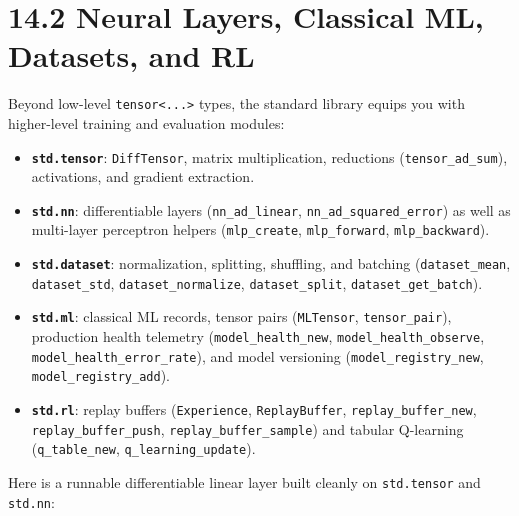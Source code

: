 \documentclass[
  english,
  oneside]{book}
\providecommand{\tightlist}{%
  \setlength{\itemsep}{0pt}\setlength{\parskip}{0pt}}
\begin{document}
\section{14.2 Neural Layers, Classical ML, Datasets, and
RL}\label{neural-layers-classical-ml-datasets-and-rl}

Beyond low-level \texttt{tensor\textless{}...\textgreater{}} types, the
standard library equips you with higher-level training and evaluation
modules:

\begin{itemize}
\tightlist
\item
  \textbf{\texttt{std.tensor}}: \texttt{DiffTensor}, matrix
  multiplication, reductions (\texttt{tensor\_ad\_sum}), activations,
  and gradient extraction.
\item
  \textbf{\texttt{std.nn}}: differentiable layers
  (\texttt{nn\_ad\_linear}, \texttt{nn\_ad\_squared\_error}) as well as
  multi-layer perceptron helpers (\texttt{mlp\_create},
  \texttt{mlp\_forward}, \texttt{mlp\_backward}).
\item
  \textbf{\texttt{std.dataset}}: normalization, splitting, shuffling,
  and batching (\texttt{dataset\_mean}, \texttt{dataset\_std},
  \texttt{dataset\_normalize}, \texttt{dataset\_split},
  \texttt{dataset\_get\_batch}).
\item
  \textbf{\texttt{std.ml}}: classical ML records, tensor pairs
  (\texttt{MLTensor}, \texttt{tensor\_pair}), production health
  telemetry (\texttt{model\_health\_new},
  \texttt{model\_health\_observe}, \texttt{model\_health\_error\_rate}),
  and model versioning (\texttt{model\_registry\_new},
  \texttt{model\_registry\_add}).
\item
  \textbf{\texttt{std.rl}}: replay buffers (\texttt{Experience},
  \texttt{ReplayBuffer}, \texttt{replay\_buffer\_new},
  \texttt{replay\_buffer\_push}, \texttt{replay\_buffer\_sample}) and
  tabular Q-learning (\texttt{q\_table\_new},
  \texttt{q\_learning\_update}).
\end{itemize}

Here is a runnable differentiable linear layer built cleanly on
\texttt{std.tensor} and \texttt{std.nn}:
\end{document}
